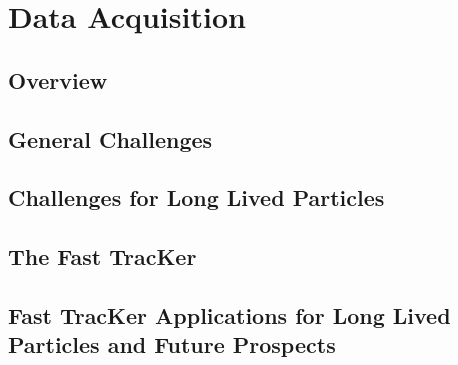 \chapter{Data Acquisition}

\section{Overview}
\section{General Challenges}
\section{Challenges for Long Lived Particles}
\section{The Fast TracKer}
\section{Fast TracKer Applications for Long Lived Particles and Future Prospects}
